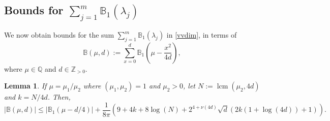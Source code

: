 \documentclass[12pt, a4paper]{article}
\newtheorem{lemma}[thm]{Lemma}
\newcommand{\BB}{\mathbb{B}}
\newcommand{\ZZ}{\mathbb{Z}}
\newcommand{\QQ}{\mathbb{Q}}
\newcommand{\opn}{\operatorname}
\begin{document}
\subsection{Bounds for $\sum_{j=1}^m \BB_1(\lambda_j)$}
We now obtain bounds for the sum $\sum_{j=1}^m \BB_1(\lambda_j)$ in \eqref{vvdim}, in terms of 
\[
\BB(\mu, d) := \sum_{x=0}^{d} \BB_1 \left ( \mu - \frac{x^2}{4d} \right ),
\]
where $\mu \in \QQ$ and $d \in \ZZ_{>0}$.
\begin{lemma}\label{Budlemma}
  If 
  $\mu = \mu_1/\mu_2$ 
  where 
  $(\mu_1, \mu_2)=1$ 
  and 
  $\mu_2>0$, 
  let 
  $N:= \opn{lcm}(\mu_2, 4d)$
  and
  $k = N/4d$.
  Then, 
  \[
  \vert \BB(\mu, d) \vert
  \leq
  \vert \BB_1(\mu - d/4) \vert
  + \frac{1}{8 \pi} \left (
  9 + 4k + 8 \opn{log}(N) + 2^{4+\nu(4d)}\sqrt{d} ( 2k(1+ \opn{log}(4d))+1)
  \right ).
\]
\end{lemma}
\end{document}
